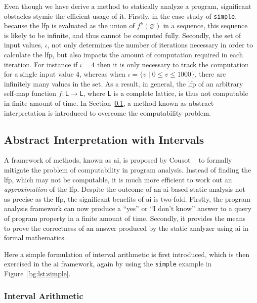 Even though we have derive a method to statically analyze a program,
significant obstacles stymie the efficient usage of it.  Firstly, in the case
study of \verb|simple|, because the \gls{lfp} is evaluated as the union of
$f^k(\varnothing)$ in a sequence, this sequence is likely to be infinite, and
thus cannot be computed fully.  Secondly, the set of input values, $\iota$,
not only determines the number of iterations necessary in order to calculate
the \gls{lfp}, but also impacts the amount of computation required in each
iteration.  For instance if $\iota = {4}$ then it is only necessary to track
the computation for a single input value $4$, whereas when $\iota = \{ v \mid
0 \leq v \leq 1000 \}$, there are infinitely many values in the set.  As
a result, in general, the \gls{lfp} of an arbitrary self-map function $f:
\mathsf{L} \to \mathsf{L}$, where $\mathsf{L}$ is a complete lattice, is thus
not computable in finite amount of time.  In Section~\ref{bg:sub:intervals},
a method known as abstract interpretation is introduced to overcome the
computability problem.


\subsection{Abstract Interpretation with Intervals}
\label{bg:sub:intervals}

A framework of methods, known as \gls{ai}, is proposed by Cousot
\etal~\cite{cousot77} to formally mitigate the problem of computability
in program analysis.  Instead of finding the \gls{lfp}, which may not be
computable, it is much more efficient to work out an \emph{approximation} of
the \gls{lfp}\@.  Despite the outcome of an \gls{ai}-based static analysis not
as precise as the \gls{lfp}, the significant benefits of \gls{ai} is two-fold.
Firstly, the program analysis framework can now produce a ``yes'' or ``I don't
know'' answer to a query of program property in a finite amount of time.
Secondly, it provides the means to prove the correctness of an answer produced
by the static analyzer using \gls{ai} in formal mathematics.

Here a simple formulation of interval arithmetic is first introduced, which
is then exercised in the \gls{ai} framework, again by using the \verb|simple|
example in Figure~\ref{bg:lst:simple}.

\subsubsection{Interval Arithmetic}
\label{bg:ssub:interval}

